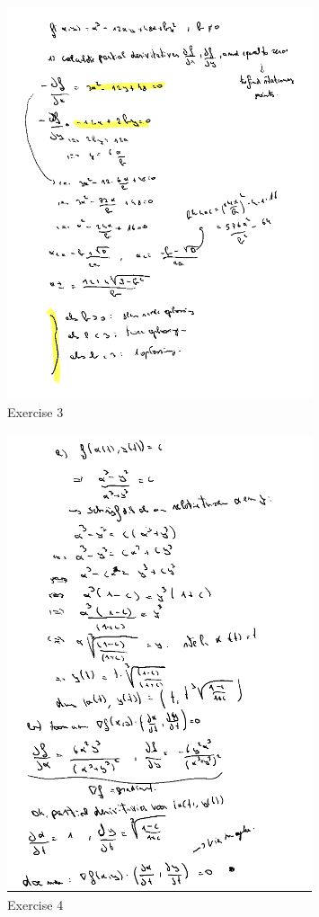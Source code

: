 \documentclass[a4paper]{article}
\begin{document}
\begin{figure}[H]
	\centering
	\includegraphics[width=0.8\textwidth]{assets/huis_4_ex_3.png}
	\caption{Exercise 3}
	\label{fig:huis_4_ex_3}
\end{figure}

\begin{figure}[H]
	\centering
	\includegraphics[width=0.8\textwidth]{assets/huis_4_ex_4.png}
	\caption{Exercise 4}
	\label{fig:huis_4_ex_4}
\end{figure}
\end{document}
